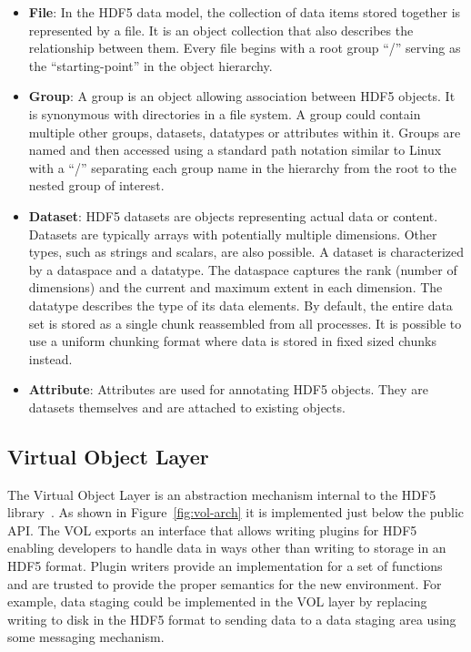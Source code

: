 \documentclass[conference]{IEEEtran} \pdfpagewidth=8.5in
\begin{document}
\begin{itemize}

\item
  \textbf{File}: In the HDF5 data model, the collection of data items stored
  together is represented by a file. It is an object collection that also
  describes the relationship between them. Every file begins with a root
  group ``/'' serving as the ``starting-point'' in the object hierarchy.

\item
  \textbf{Group}: A group is an object allowing association between HDF5
  objects. It is synonymous with directories in a file system. A group
  could contain multiple other groups, datasets, datatypes or attributes within
  it. Groups are named and then accessed using a standard path notation
  similar to Linux with a ``/'' separating each group name in the hierarchy
  from the root to the nested group of interest.

\item
  \textbf{Dataset}: HDF5 datasets are objects representing actual data
  or content. Datasets are typically arrays with potentially multiple
  dimensions. Other types, such as strings and scalars, are also possible. A
  dataset is characterized by a dataspace and a datatype. The dataspace
  captures the rank (number of dimensions) and the current and maximum
  extent in each dimension. The datatype describes the type of its data
  elements. By default, the entire data set is stored as a single chunk
  reassembled from all processes. It is possible to use a uniform chunking
  format where data is stored in fixed sized chunks instead.

\item
  \textbf{Attribute}: Attributes are used for annotating HDF5 objects. They are
  datasets themselves and are attached to existing objects.

\end{itemize}

\subsection{Virtual Object Layer}
\label{virtual-object-layer}

The Virtual Object Layer is an abstraction mechanism internal to the HDF5
library~\cite{folk:2011:hdf5}. As shown in Figure~\ref{fig:vol-arch} it is implemented
just below the public API. The VOL exports an interface that allows writing
plugins for HDF5 enabling developers to handle data in ways other than writing
to storage in an HDF5 format.  Plugin writers provide an implementation for a
set of functions and are trusted to provide the proper semantics for the new
environment. For example, data staging could be implemented in the VOL layer by
replacing writing to disk in the HDF5 format to sending data to a data staging
area using some messaging mechanism.
\end{document}
